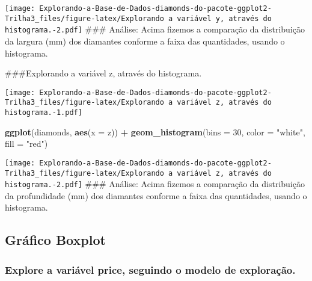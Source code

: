 \documentclass[
]{article}
\newenvironment{Shaded}{\begin{snugshade}}{\end{snugshade}}
\newcommand{\DataTypeTok}[1]{\textcolor[rgb]{0.13,0.29,0.53}{#1}}
\newcommand{\DecValTok}[1]{\textcolor[rgb]{0.00,0.00,0.81}{#1}}
\newcommand{\KeywordTok}[1]{\textcolor[rgb]{0.13,0.29,0.53}{\textbf{#1}}}
\newcommand{\NormalTok}[1]{#1}
\newcommand{\OperatorTok}[1]{\textcolor[rgb]{0.81,0.36,0.00}{\textbf{#1}}}
\newcommand{\StringTok}[1]{\textcolor[rgb]{0.31,0.60,0.02}{#1}}
\begin{document}
\texttt{[image: Explorando-a-Base-de-Dados-diamonds-do-pacote-ggplot2-Trilha3\_files/figure-latex/Explorando a variável y, através do histograma.-2.pdf]}
\#\#\# Análise: Acima fizemos a comparação da distribuição da largura
(mm) dos diamantes conforme a faixa das quantidades, usando o
histograma.

\#\#\#Explorando a variável z, através do histograma.

\begin{Shaded}
\end{Shaded}

\texttt{[image: Explorando-a-Base-de-Dados-diamonds-do-pacote-ggplot2-Trilha3\_files/figure-latex/Explorando a variável z, através do histograma.-1.pdf]}

\begin{Shaded}
\begin{Highlighting}[]
\KeywordTok{ggplot}\NormalTok{(diamonds, }\KeywordTok{aes}\NormalTok{(}\DataTypeTok{x =}\NormalTok{ z)) }\OperatorTok{+}\StringTok{ }\KeywordTok{geom_histogram}\NormalTok{(}\DataTypeTok{bins =} \DecValTok{30}\NormalTok{, }\DataTypeTok{color =} \StringTok{"white"}\NormalTok{, }\DataTypeTok{fill =} \StringTok{"red"}\NormalTok{)}
\end{Highlighting}
\end{Shaded}

\texttt{[image: Explorando-a-Base-de-Dados-diamonds-do-pacote-ggplot2-Trilha3\_files/figure-latex/Explorando a variável z, através do histograma.-2.pdf]}
\#\#\# Análise: Acima fizemos a comparação da distribuição da
profundidade (mm) dos diamantes conforme a faixa das quantidades, usando
o histograma.

\hypertarget{gruxe1fico-boxplot}{%
\subsection{Gráfico Boxplot}\label{gruxe1fico-boxplot}}

\hypertarget{explore-a-variuxe1vel-price-seguindo-o-modelo-de-explorauxe7uxe3o.}{%
\subsubsection{Explore a variável price, seguindo o modelo de
exploração.}\label{explore-a-variuxe1vel-price-seguindo-o-modelo-de-explorauxe7uxe3o.}}
\end{document}
